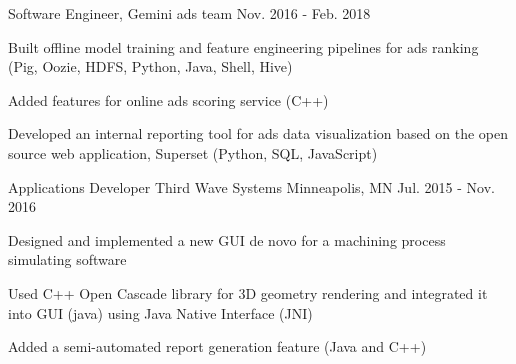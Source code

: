 \begin{cventries}
  \cventry
    {Software Engineer, Gemini ads team} %
    {} %
    {} %
    {Nov. 2016 - Feb. 2018} %
    {
      \begin{cvitems} %
        \item {Built offline model training and feature engineering pipelines for ads ranking (Pig, Oozie, HDFS, Python, Java, Shell, Hive)}
        \item {Added features for online ads scoring service (C++)}
        \item {Developed an internal reporting tool for ads data visualization based on the open source web application,
Superset (Python, SQL, JavaScript)}
      \end{cvitems}
    }
    
  \cventry
    {Applications Developer} %
    {Third Wave Systems} %
    {Minneapolis, MN} %
    {Jul. 2015 - Nov. 2016} %
    {
      \begin{cvitems} %
        \item {Designed and implemented a new GUI de novo for a machining process simulating software}
        \item {Used C++ Open Cascade library for 3D geometry rendering and integrated it into GUI (java) using Java Native Interface (JNI)}
        \item {Added a semi-automated report generation feature (Java and C++)}
      \end{cvitems}
    }


\end{cventries}
